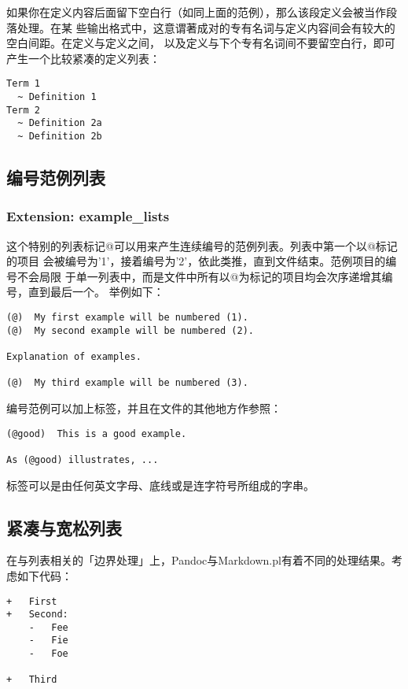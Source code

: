 \documentclass[fancyhdr,bookmark]{ctexbook}
\begin{document}
如果你在定义内容后面留下空白行（如同上面的范例），那么该段定义会被当作段落处理。在某
些输出格式中，这意谓著成对的专有名词与定义内容间会有较大的空白间距。在定义与定义之间，
以及定义与下个专有名词间不要留空白行，即可产生一个比较紧凑的定义列表：

\begin{lstlisting}
Term 1
  ~ Definition 1
Term 2
  ~ Definition 2a
  ~ Definition 2b
\end{lstlisting}

\subsection{编号范例列表}\label{ux7f16ux53f7ux8303ux4f8bux5217ux8868}

\subsubsection{Extension:
example\_lists}\label{extension-exampleux5flists}

这个特别的列表标记@可以用来产生连续编号的范例列表。列表中第一个以@标记的项目
会被编号为'1'，接着编号为'2'，依此类推，直到文件结束。范例项目的编号不会局限
于单一列表中，而是文件中所有以@为标记的项目均会次序递增其编号，直到最后一个。
举例如下：

\begin{lstlisting}
(@)  My first example will be numbered (1).
(@)  My second example will be numbered (2).

Explanation of examples.

(@)  My third example will be numbered (3).
\end{lstlisting}

编号范例可以加上标签，并且在文件的其他地方作参照：

\begin{lstlisting}
(@good)  This is a good example.

As (@good) illustrates, ...
\end{lstlisting}

标签可以是由任何英文字母、底线或是连字符号所组成的字串。

\subsection{紧凑与宽松列表}\label{ux7d27ux51d1ux4e0eux5bbdux677eux5217ux8868}

在与列表相关的「边界处理」上，Pandoc与Markdown.pl有着不同的处理结果。考虑如下代码：

\begin{lstlisting}
+   First
+   Second:
    -   Fee
    -   Fie
    -   Foe

+   Third
\end{lstlisting}
\end{document}
